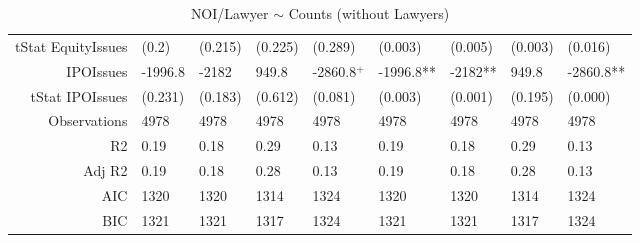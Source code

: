 \begin{table}[ht]
\begin{tabular}{rllllllll}
  tStat EquityIssues & (0.2) & (0.215) & (0.225) & (0.289) & (0.003) & (0.005) & (0.003) & (0.016) \\ 
  IPOIssues & -1996.8 & -2182 & 949.8 & -2860.8$^{+}$ & -1996.8** & -2182** & 949.8 & -2860.8** \\ 
  tStat IPOIssues & (0.231) & (0.183) & (0.612) & (0.081) & (0.003) & (0.001) & (0.195) & (0.000) \\ 
  Observations & 4978 & 4978 & 4978 & 4978 & 4978 & 4978 & 4978 & 4978 \\ 
  R2 & 0.19 & 0.18 & 0.29 & 0.13 & 0.19 & 0.18 & 0.29 & 0.13 \\ 
  Adj R2 & 0.19 & 0.18 & 0.28 & 0.13 & 0.19 & 0.18 & 0.28 & 0.13 \\ 
  AIC & 1320 & 1320 & 1314 & 1324 & 1320 & 1320 & 1314 & 1324 \\ 
  BIC & 1321 & 1321 & 1317 & 1324 & 1321 & 1321 & 1317 & 1324 \\ 
   \hline
\end{tabular}
\caption{NOI/Lawyer $\sim$ Counts (without Lawyers)} 
\end{table}
